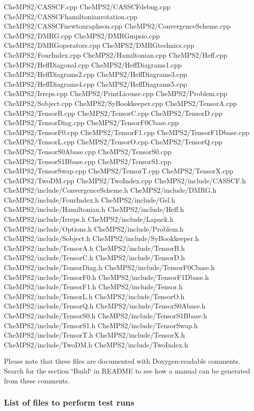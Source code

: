\begin{DoxyVerb}CheMPS2/CASSCF.cpp
CheMPS2/CASSCFdebug.cpp
CheMPS2/CASSCFhamiltonianrotation.cpp
CheMPS2/CASSCFnewtonraphson.cpp
CheMPS2/ConvergenceScheme.cpp
CheMPS2/DMRG.cpp
CheMPS2/DMRGmpsio.cpp
CheMPS2/DMRGoperators.cpp
CheMPS2/DMRGtechnics.cpp
CheMPS2/FourIndex.cpp
CheMPS2/Hamiltonian.cpp
CheMPS2/Heff.cpp
CheMPS2/HeffDiagonal.cpp
CheMPS2/HeffDiagrams1.cpp
CheMPS2/HeffDiagrams2.cpp
CheMPS2/HeffDiagrams3.cpp
CheMPS2/HeffDiagrams4.cpp
CheMPS2/HeffDiagrams5.cpp
CheMPS2/Irreps.cpp
CheMPS2/PrintLicense.cpp
CheMPS2/Problem.cpp
CheMPS2/Sobject.cpp
CheMPS2/SyBookkeeper.cpp
CheMPS2/TensorA.cpp
CheMPS2/TensorB.cpp
CheMPS2/TensorC.cpp
CheMPS2/TensorD.cpp
CheMPS2/TensorDiag.cpp
CheMPS2/TensorF0Cbase.cpp
CheMPS2/TensorF0.cpp
CheMPS2/TensorF1.cpp
CheMPS2/TensorF1Dbase.cpp
CheMPS2/TensorL.cpp
CheMPS2/TensorO.cpp
CheMPS2/TensorQ.cpp
CheMPS2/TensorS0Abase.cpp
CheMPS2/TensorS0.cpp
CheMPS2/TensorS1Bbase.cpp
CheMPS2/TensorS1.cpp
CheMPS2/TensorSwap.cpp
CheMPS2/TensorT.cpp
CheMPS2/TensorX.cpp
CheMPS2/TwoDM.cpp
CheMPS2/TwoIndex.cpp
CheMPS2/include/CASSCF.h
CheMPS2/include/ConvergenceScheme.h
CheMPS2/include/DMRG.h
CheMPS2/include/FourIndex.h
CheMPS2/include/Gsl.h
CheMPS2/include/Hamiltonian.h
CheMPS2/include/Heff.h
CheMPS2/include/Irreps.h
CheMPS2/include/Lapack.h
CheMPS2/include/Options.h
CheMPS2/include/Problem.h
CheMPS2/include/Sobject.h
CheMPS2/include/SyBookkeeper.h
CheMPS2/include/TensorA.h
CheMPS2/include/TensorB.h
CheMPS2/include/TensorC.h
CheMPS2/include/TensorD.h
CheMPS2/include/TensorDiag.h
CheMPS2/include/TensorF0Cbase.h
CheMPS2/include/TensorF0.h
CheMPS2/include/TensorF1Dbase.h
CheMPS2/include/TensorF1.h
CheMPS2/include/Tensor.h
CheMPS2/include/TensorL.h
CheMPS2/include/TensorO.h
CheMPS2/include/TensorQ.h
CheMPS2/include/TensorS0Abase.h
CheMPS2/include/TensorS0.h
CheMPS2/include/TensorS1Bbase.h
CheMPS2/include/TensorS1.h
CheMPS2/include/TensorSwap.h
CheMPS2/include/TensorT.h
CheMPS2/include/TensorX.h
CheMPS2/include/TwoDM.h
CheMPS2/include/TwoIndex.h
\end{DoxyVerb}


Please note that these files are documented with Doxygen-\/readable comments. Search for the section \char`\"{}\-Build\char`\"{} in R\-E\-A\-D\-M\-E to see how a manual can be generated from these comments.

\subsubsection*{List of files to perform test runs}

